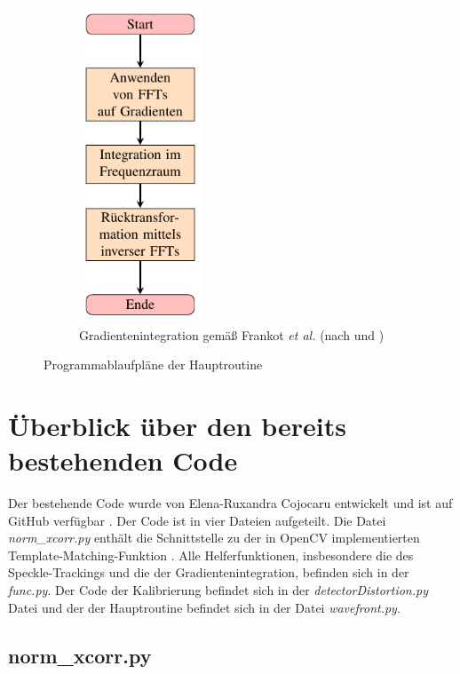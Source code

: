 \begin{figure}[htbp]
\begin{subfigure}[b]{0.45\textwidth}
		\includegraphics[width=0.4\textwidth]{pdf/graph_fc}
		\caption[Frankot-Chellappa]{Gradientenintegration gemäß Frankot \textit{et al.} (nach \cite{FC88} und \cite{Kov04})}
		\label{fig:graph_fc}
	\end{subfigure}
	\caption[Algorithmen]{Programmablaufpläne der Hauptroutine}
\end{figure}

\section{Überblick über den bereits bestehenden Code}

Der bestehende Code wurde von Elena-Ruxandra Cojocaru entwickelt und ist auf GitHub verfügbar \cite{Coj17}. Der Code ist in vier Dateien aufgeteilt. Die Datei \textit{norm\_xcorr.py} enthält die Schnittstelle zu der in OpenCV implementierten Template-Matching-Funktion \cite{SA17}. Alle Helferfunktionen, insbesondere die des Speckle-Trackings und die der Gradientenintegration, befinden sich in der \textit{func.py}. Der Code der Kalibrierung befindet sich in der \textit{detectorDistortion.py} Datei und der der Hauptroutine befindet sich in der Datei \textit{wavefront.py}. 

\subsection{norm\_xcorr.py}

